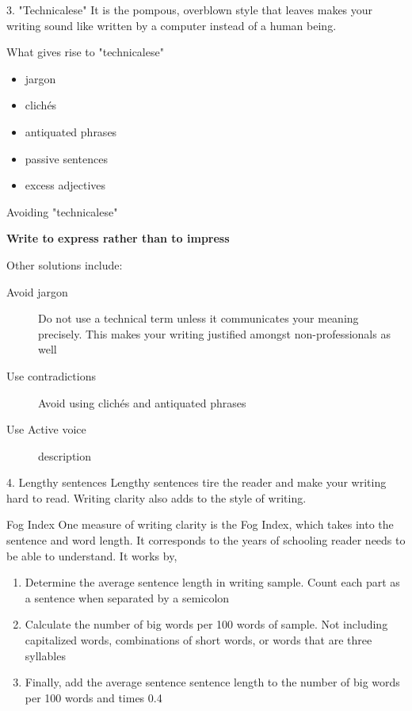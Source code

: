 \documentclass[10pt]{beamer}
\begin{document}
{
	\begin{frame}{3. "Technicalese"}
		It is the pompous, overblown style that leaves makes your writing sound like written by a computer instead of a human being. 
		
		\begin{alertblock}{What gives rise to "technicalese"}
			\begin{itemize}[<+- | alert@+>]
				\item jargon
				\item clich\'{e}s
				\item antiquated phrases
				\item passive sentences 
				\item excess adjectives
			\end{itemize} 
		\end{alertblock}
	\end{frame}
}
{
	\begin{frame}{Avoiding "technicalese"}
		\begin{center}
			\begin{alertblock}{
					\bfseries{Write to express rather than to impress\\}}
			\end{alertblock}
		\end{center}
		
		Other solutions include:
		\begin{description}
			\item[Avoid jargon] Do not use a technical term unless it communicates your meaning precisely. This makes your writing justified amongst non-professionals as well
			\item[Use contradictions] Avoid using clich\'{e}s and antiquated phrases
			\item[Use Active voice] description
		\end{description}
	\end{frame}
}
{
	\begin{frame}{4. Lengthy sentences}
		Lengthy sentences tire the reader and make your writing hard to read. Writing clarity also adds to the style of writing.\\ 
		 
		\begin{alertblock}{Fog Index}
			One measure of writing clarity is the Fog Index, which takes into the sentence and word length. It corresponds to the years of schooling reader needs to be able to understand. It works by, 
			\begin{enumerate}[<+- | alert@+>]
				\item Determine the average sentence length in writing sample. Count each part as a sentence when separated by a semicolon
				\item Calculate the number of big words per 100 words of sample. Not including capitalized words, combinations of short words, or words that are three syllables
				\item Finally, add the average sentence sentence length to the number of big words per 100 words and times 0.4
			\end{enumerate} 
		\end{alertblock}
	\end{frame}
}
\end{document}
